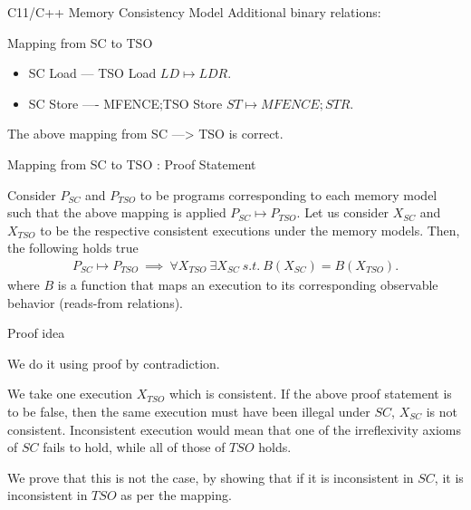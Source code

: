 \documentclass[xcolor={dvipsnames}, notes]{beamer}
\begin{document}
    \begin{frame}{C11/C++ Memory Consistency Model}
        Additional binary relations:
    \end{frame}

    

    \begin{frame}{Mapping from SC to TSO}

        \begin{itemize}
            \item SC Load --- TSO Load $LD \mapsto LDR$.
            \item SC Store ---- MFENCE;TSO Store $ST \mapsto MFENCE;STR$.
        \end{itemize}

            The above mapping from SC ---> TSO is correct.
        
    \end{frame}

    \begin{frame}{Mapping from SC to TSO : Proof Statement}

        Consider $P_{SC}$ and $P_{TSO}$ to be programs corresponding to each memory model such that the above mapping is applied $P_{SC} \mapsto P_{TSO}$.
        Let us consider $X_{SC}$ and $X_{TSO}$ to be the respective consistent executions under the memory models.
        Then, the following holds true
        \begin{align*}
            P_{SC} \mapsto P_{TSO} \ \implies \ \forall X_{TSO} \ \exists X_{SC} \ \textit{s.t.} \ B(X_{SC}) = B(X_{TSO}). 
        \end{align*}
        where $B$ is a function that maps an execution to its corresponding observable behavior (reads-from relations).
        
    \end{frame}

    \begin{frame}{Proof idea}
        
        We do it using proof by contradiction.

        We take one execution $X_{TSO}$ which is consistent.
        If the above proof statement is to be false, then the same execution must have been illegal under $SC$, $X_{SC}$ is not consistent.
        Inconsistent execution would mean that one of the irreflexivity axioms of $SC$ fails to hold, while all of those of $TSO$ holds.

        We prove that this is not the case, by showing that if it is inconsistent in $SC$, it is inconsistent in $TSO$ as per the mapping.
        
    \end{frame}
\end{document}

